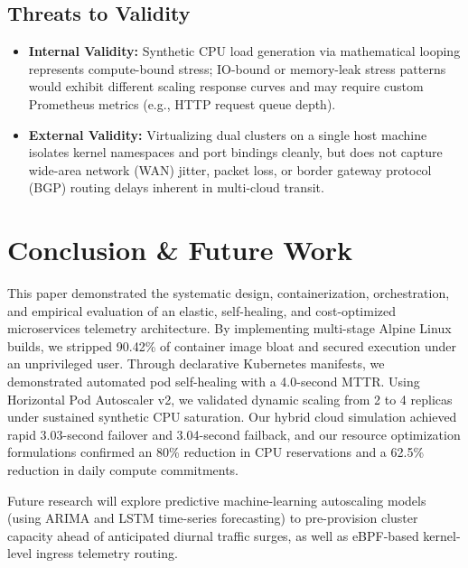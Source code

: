 \documentclass[conference]{IEEEtran}
\begin{document}
\subsection{Threats to Validity}
\begin{itemize}
    \item \textbf{Internal Validity:} Synthetic CPU load generation via mathematical looping represents compute-bound stress; IO-bound or memory-leak stress patterns would exhibit different scaling response curves and may require custom Prometheus metrics (e.g., HTTP request queue depth).
    \item \textbf{External Validity:} Virtualizing dual clusters on a single host machine isolates kernel namespaces and port bindings cleanly, but does not capture wide-area network (WAN) jitter, packet loss, or border gateway protocol (BGP) routing delays inherent in multi-cloud transit.
\end{itemize}

\section{Conclusion \& Future Work}

This paper demonstrated the systematic design, containerization, orchestration, and empirical evaluation of an elastic, self-healing, and cost-optimized microservices telemetry architecture. By implementing multi-stage Alpine Linux builds, we stripped 90.42\% of container image bloat and secured execution under an unprivileged user. Through declarative Kubernetes manifests, we demonstrated automated pod self-healing with a 4.0-second MTTR. Using Horizontal Pod Autoscaler v2, we validated dynamic scaling from 2 to 4 replicas under sustained synthetic CPU saturation. Our hybrid cloud simulation achieved rapid 3.03-second failover and 3.04-second failback, and our resource optimization formulations confirmed an 80\% reduction in CPU reservations and a 62.5\% reduction in daily compute commitments.

Future research will explore predictive machine-learning autoscaling models (using ARIMA and LSTM time-series forecasting) to pre-provision cluster capacity ahead of anticipated diurnal traffic surges, as well as eBPF-based kernel-level ingress telemetry routing.
\end{document}
